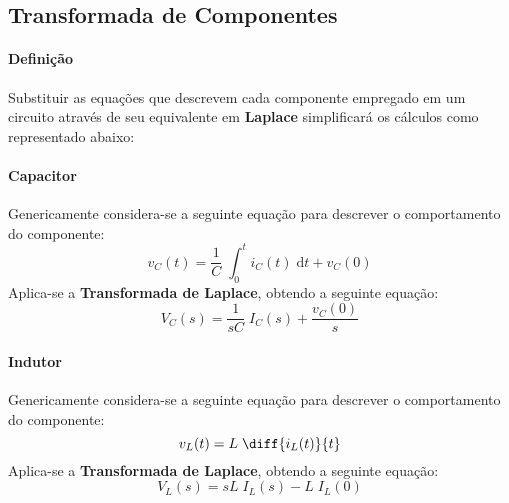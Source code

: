 \documentclass{article}
\begin{document}
        \subsection{Transformada de Componentes}
            \paragraph{Definição}Substituir as equações que descrevem cada componente empregado em um circuito através de seu equivalente em \textbf{Laplace} simplificará os cálculos como representado abaixo:
                \begin{multicols*}{2}
                    \raggedcolumns
                    \paragraph{Capacitor}Genericamente considera-se a seguinte equação para descrever o comportamento do componente:
                        \begin{equation*}
                            v_{C}(t) = \frac{1}{C}\;\int_{0}^{t} i_{C}(t)\;\text{d}t + v_{C}(0)
                        \end{equation*}
                    Aplica-se a \textbf{Transformada de Laplace}, obtendo a seguinte equação:
                        \begin{equation}
                            \boxed{
                                V_{C}(s) = \frac{1}{sC}\;I_{C}(s) + \frac{v_{C}(0)}{s}
                            }
                        \end{equation}

                    \paragraph{Indutor}Genericamente considera-se a seguinte equação para descrever o comportamento do componente:
                        \begin{equation*}
                            v_{L}(t) = L\;\diff{i_{L}(t)}{t}
                        \end{equation*}
                    Aplica-se a \textbf{Transformada de Laplace}, obtendo a seguinte equação:
                        \begin{equation}
                            \boxed{
                                V_{L}(s) = sL\;I_{L}(s) - L\;I_{L}(0)
                            }
                        \end{equation}


\end{multicols*}
\end{document}
